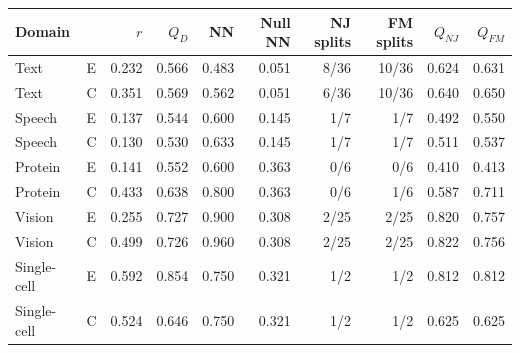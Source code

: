 \begin{tabular}{llrrrrrrrr}
\toprule
Domain &  & $r$ & $Q_D$ & NN & Null NN & NJ splits & FM splits & $Q_{NJ}$ & $Q_{FM}$ \\
\midrule
Text & E & 0.232 & 0.566 & 0.483 & 0.051 & 8/36 & 10/36 & 0.624 & 0.631 \\
Text & C & 0.351 & 0.569 & 0.562 & 0.051 & 6/36 & 10/36 & 0.640 & 0.650 \\
Speech & E & 0.137 & 0.544 & 0.600 & 0.145 & 1/7 & 1/7 & 0.492 & 0.550 \\
Speech & C & 0.130 & 0.530 & 0.633 & 0.145 & 1/7 & 1/7 & 0.511 & 0.537 \\
Protein & E & 0.141 & 0.552 & 0.600 & 0.363 & 0/6 & 0/6 & 0.410 & 0.413 \\
Protein & C & 0.433 & 0.638 & 0.800 & 0.363 & 0/6 & 1/6 & 0.587 & 0.711 \\
Vision & E & 0.255 & 0.727 & 0.900 & 0.308 & 2/25 & 2/25 & 0.820 & 0.757 \\
Vision & C & 0.499 & 0.726 & 0.960 & 0.308 & 2/25 & 2/25 & 0.822 & 0.756 \\
Single-cell & E & 0.592 & 0.854 & 0.750 & 0.321 & 1/2 & 1/2 & 0.812 & 0.812 \\
Single-cell & C & 0.524 & 0.646 & 0.750 & 0.321 & 1/2 & 1/2 & 0.625 & 0.625 \\
\bottomrule
\end{tabular}
